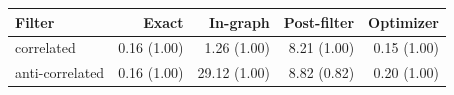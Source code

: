 \begin{tabular}{lrrrr}
\toprule
Filter & Exact & In-graph & Post-filter & Optimizer \\
\midrule
correlated & 0.16 (1.00) & 1.26 (1.00) & 8.21 (1.00) & 0.15 (1.00) \\
anti-correlated & 0.16 (1.00) & 29.12 (1.00) & 8.82 (0.82) & 0.20 (1.00) \\
\bottomrule
\end{tabular}
